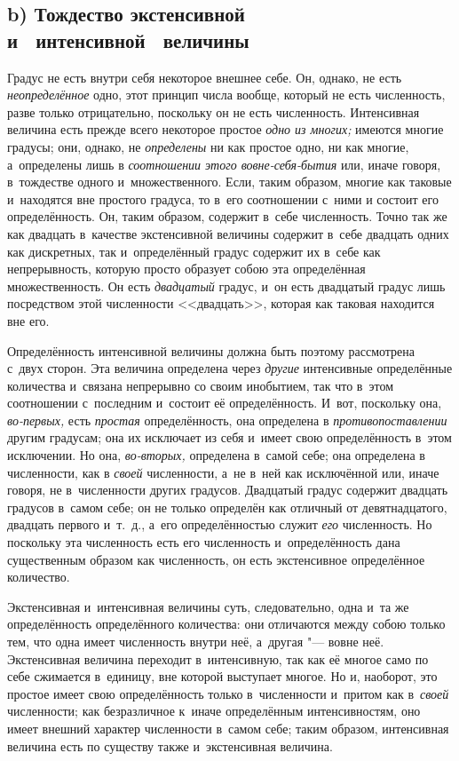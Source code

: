 \subsection[b) Тождество экстенсивной и~интенсивной величины]%
{b) Тождество экстенсивной\nopagebreak\\и~ интенсивной~ величины}

Градус не есть внутри себя некоторое внешнее себе. Он, однако, не есть
{\em неопределённое} одно, этот принцип числа вообще, который не есть
численность, разве только отрицательно, поскольку он не есть численность.
Интенсивная величина есть прежде всего некоторое простое {\em одно из многих;}
имеются многие градусы; они, однако, не {\em определены} ни как простое одно,
ни как многие, а~определены лишь в {\em соотношении этого вовне-себя-бытия} или,
иначе говоря, в~тождестве одного и~множественного. Если, таким образом, многие
как таковые и~находятся вне простого градуса, то в~его соотношении с~ними и
состоит его определённость. Он, таким образом, содержит в~себе численность.
Точно так же как двадцать в~качестве экстенсивной величины содержит в~себе
двадцать одних как дискретных, так и~определённый градус содержит их в~себе как
непрерывность, которую просто образует собою эта определённая множественность.
Он есть {\em двадцатый} градус, и~он есть двадцатый градус лишь посредством
этой численности <<двадцать>>, которая как таковая находится вне его.

Определённость интенсивной величины должна быть поэтому рассмотрена с~двух
сторон. Эта величина определена через {\em другие} интенсивные определённые
количества и~связана непрерывно со своим инобытием, так что в~этом соотношении
с~последним и~состоит её определённость. И~вот, поскольку она, {\em во-первых,}
есть {\em простая} определённость, она определена в {\em противопоставлении}
другим градусам; она их исключает из себя и~имеет свою определённость в~этом
исключении. Но она, {\em во-вторых,} определена в~самой себе; она определена в
численности, как в {\em своей} численности, а~не в~ней как исключённой или,
иначе говоря, не в~численности других градусов. Двадцатый градус содержит
двадцать градусов в~самом себе; он не только определён как отличный от
девятнадцатого, двадцать первого и~т.~д., а~его определённостью служит
{\em его} численность. Но поскольку эта численность есть его численность
и~определённость дана существенным образом как численность, он есть
экстенсивное определённое количество.

Экстенсивная и~интенсивная величины суть, следовательно, одна и~та же
определённость определённого количества: они отличаются между собою только тем,
что одна имеет численность внутри неё, а~другая "--- вовне неё.
Экстенсивная величина переходит в~интенсивную, так как её многое само по себе
сжимается в~единицу, вне которой выступает многое. Но и, наоборот, это простое
имеет свою определённость только в~численности и~притом как в~{\em своей}
численности; как безразличное к~иначе определённым интенсивностям, оно имеет
внешний характер численности в~самом себе; таким образом, интенсивная величина
есть по существу также и~экстенсивная величина.

